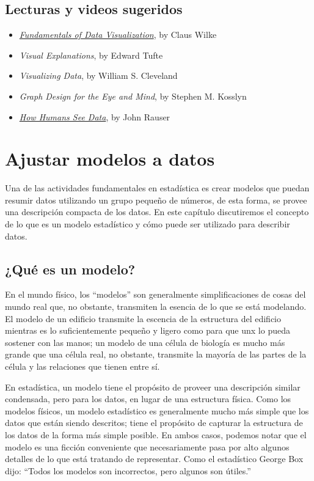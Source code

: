 \documentclass[
  12pt,
]{book}
\providecommand{\tightlist}{%
  \setlength{\itemsep}{0pt}\setlength{\parskip}{0pt}}
\theoremstyle{definition}
\theoremstyle{definition}
\theoremstyle{definition}
\theoremstyle{remark}
\begin{document}
\hypertarget{lecturas-y-videos-sugeridos}{%
\section{Lecturas y videos sugeridos}\label{lecturas-y-videos-sugeridos}}

\begin{itemize}
\tightlist
\item
  \href{https://serialmentor.com/dataviz/}{\emph{Fundamentals of Data Visualization}}, by Claus Wilke
\item
  \emph{Visual Explanations}, by Edward Tufte
\item
  \emph{Visualizing Data}, by William S. Cleveland
\item
  \emph{Graph Design for the Eye and Mind}, by Stephen M. Kosslyn
\item
  \href{https://www.youtube.com/watch?v=fSgEeI2Xpdc\&feature=youtu.be}{\emph{How Humans See Data}}, by John Rauser
\end{itemize}

\hypertarget{fitting-models}{%
\chapter{Ajustar modelos a datos}\label{fitting-models}}

Una de las actividades fundamentales en estadística es crear modelos que puedan resumir datos utilizando un grupo pequeño de números, de esta forma, se provee una descripción compacta de los datos. En este capítulo discutiremos el concepto de lo que es un modelo estadístico y cómo puede ser utilizado para describir datos.

\hypertarget{quuxe9-es-un-modelo}{%
\section{¿Qué es un modelo?}\label{quuxe9-es-un-modelo}}

En el mundo físico, los ``modelos'' son generalmente simplificaciones de cosas del mundo real que, no obstante, transmiten la esencia de lo que se está modelando. El modelo de un edificio transmite la escencia de la estructura del edificio mientras es lo suficientemente pequeño y ligero como para que unx lo pueda sostener con las manos; un modelo de una célula de biología es mucho más grande que una célula real, no obstante, transmite la mayoría de las partes de la célula y las relaciones que tienen entre sí.

En estadística, un modelo tiene el propósito de proveer una descripción similar condensada, pero para los datos, en lugar de una estructura física. Como los modelos físicos, un modelo estadístico es generalmente mucho más simple que los datos que están siendo descritos; tiene el propósito de capturar la estructura de los datos de la forma más simple posible. En ambos casos, podemos notar que el modelo es una ficción conveniente que necesariamente pasa por alto algunos detalles de lo que está tratando de representar. Como el estadístico George Box dijo: ``Todos los modelos son incorrectos, pero algunos son útiles.''
\end{document}
